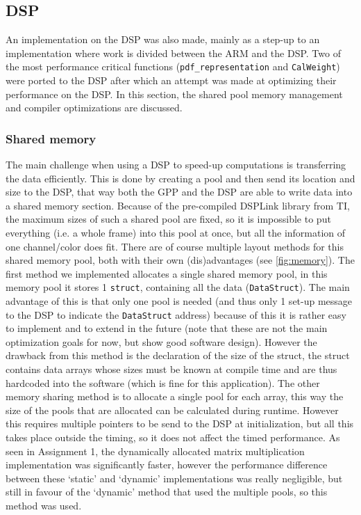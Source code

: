 \documentclass[final]{article}
\begin{document}
\subsection{DSP}
An implementation on the DSP was also made, mainly as a step-up to an implementation where work is divided between the ARM and the DSP.
Two of the most performance critical functions (\texttt{pdf\_representation} and \texttt{CalWeight}) were ported to the DSP after which an attempt was made at optimizing their performance on the DSP.
In this section, the shared pool memory management and compiler optimizations are discussed.

\subsubsection{Shared memory}
The main challenge when using a DSP to speed-up computations is transferring the data efficiently.
This is done by creating a pool and then send its location and size to the DSP, that way both the GPP and the DSP are able to write data into a shared memory section.
Because of the pre-compiled DSPLink library from TI, the maximum sizes of such a shared pool are fixed, so it is impossible to put everything (i.e. a whole frame) into this pool at once, but all the information of one channel/color does fit.
There are of course multiple layout methods for this shared memory pool, both with their own (dis)advantages (see \autoref{fig:memory}).
The first method we implemented allocates a single shared memory pool, in this memory pool it stores 1 \texttt{struct}, containing all the data (\texttt{DataStruct}).
The main advantage of this is that only one pool is needed (and thus only 1 set-up message to the DSP to indicate the \texttt{DataStruct} address) because of this it is rather easy to implement and to extend in the future (note that these are not the main optimization goals for now, but show good software design).
However the drawback from this method is the declaration of the size of the struct, the struct contains data arrays whose sizes must be known at compile time and are thus hardcoded into the software (which is fine for this application).
The other memory sharing method is to allocate a single pool for each array, this way the size of the pools that are allocated can be calculated during runtime.
However this requires multiple pointers to be send to the DSP at initialization, but all this takes place outside the timing, so it does not affect the timed performance.
As seen in Assignment 1, the dynamically allocated matrix multiplication implementation was significantly faster, however the performance difference between these `static' and `dynamic' implementations was really negligible, but still in favour of the `dynamic' method that used the multiple pools, so this method was used.
\end{document}

